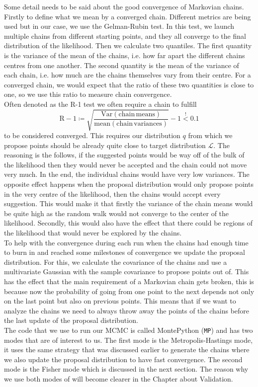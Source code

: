 \documentclass[../main.tex]{subfiles}
\begin{document}
Some detail needs to be said about the good convergence of Markovian chains. Firstly to define what we mean by a converged chain. Different metrics are being used but in our case, we use the Gelman-Rubin test. In this test, we launch multiple chains from different starting points, and they all converge to the final distribution of the likelihood. Then we calculate two quantiles. The first quantity is the variance of the mean of the chains, i.e. how far apart the different chains centres from one another. The second quantity is the mean of the variance of each chain, i.e. how much are the chains themselves vary from their centre. For a converged chain, we would expect that the ratio of these two quantities is close to one, so we use this ratio to measure chain convergence.\\
Often denoted as the R-1 test we often require a chain to fulfill 
\begin{equation}
 \mathrm{R}-1 \coloneqq \sqrt{\frac{\mathrm{Var(chain\,means)}}{\mathrm{mean(chain\,variances)}}} -1 \overset{!}{<} 0.1
\end{equation}
to be considered converged. This requires our distribution $q$ from which we propose points should be already quite close to target distribution $\mathcal{L}$. The reasoning is the follows, if the suggested points would be way off of the bulk of the likelihood then they would never be accepted and the chain could not move very much. In the end, the individual chains would have very low variances. The opposite effect happens when the proposal distribution would only propose points in the very centre of the likelihood, then the chains would accept every suggestion. This would make it that firstly the variance of the chain means would be quite high as the random walk would not converge to the center of the likelihood. Secondly, this would also have the effect that there could be regions of the likelihood that would never be explored by the chains.\\
To help with the convergence during each run when the chains had enough time to burn in and reached some milestones of convergence we update the proposal distribution. For this, we calculate the covariance of the chains and use a multivariate Gaussian with the sample covariance to propose points out of. This has the effect that the main requirement of a Markovian chain gets broken, this is because now the probability of going from one point to the next depends not only on the last point but also on previous points. This means that if we want to analyze the chains we need to always throw away the points of the chains before the last update of the proposal distribution.\\
The code that we use to run our MCMC is called MontePython ({\tt MP}) and has two modes that are of interest to us. The first mode is the Metropolis-Hastings mode, it uses the same strategy that was discussed earlier to generate the chains where we also update the proposal distribution to have fast convergence. The second mode is the Fisher mode which is discussed in the next section. The reason why we use both modes of \montepython will become clearer in the Chapter about Validation.  
\end{document}

